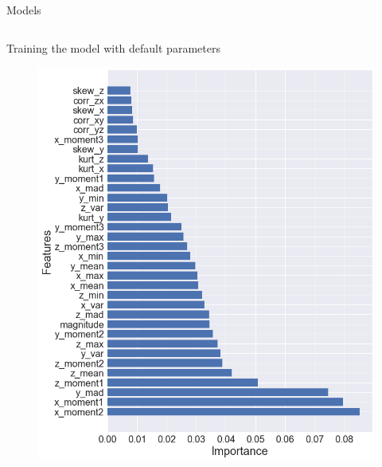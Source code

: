 \documentclass{if-beamer}
\begin{document}
\begin{frame}{Models}
\begin{columns}
\begin{column}{0.5\textwidth}
    Training the model with default parameters
       \begin{figure}
            \includegraphics[scale=0.2]{./figs/importance.png}
            \end{figure}             
 \end{column}
 \end{columns}
\end{frame}
\end{document}
